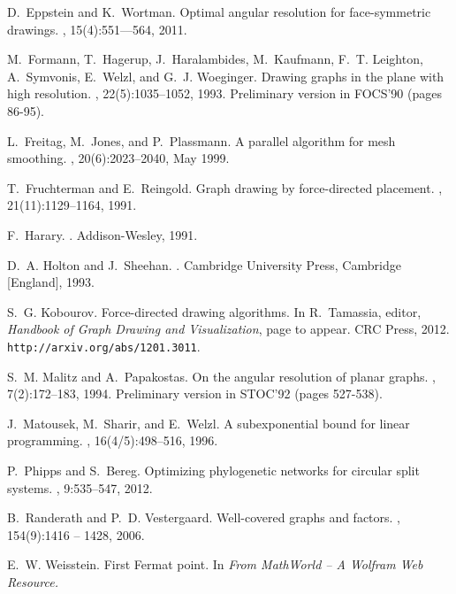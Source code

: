 \documentclass[10pt]{article}
\begin{document}
\begin{thebibliography}{99}
D.~Eppstein and K.~Wortman.
\newblock Optimal angular resolution for face-symmetric drawings.
,
  15(4):551--–564, 2011.

M.~Formann, T.~Hagerup, J.~Haralambides, M.~Kaufmann, F.~T. Leighton,
  A.~Symvonis, E.~Welzl, and G.~J. Woeginger.
\newblock Drawing graphs in the plane with high resolution.
, 22(5):1035--1052, 1993. {Preliminary version
  in FOCS'90 (pages 86-95)}.

L.~Freitag, M.~Jones, and P.~Plassmann.
\newblock A parallel algorithm for mesh smoothing.
, 20(6):2023--2040, May 1999.

T.~Fruchterman and E.~Reingold.
\newblock Graph drawing by force-directed placement.
, 21(11):1129--1164, 1991.

F.~Harary.
.
\newblock Addison-Wesley, 1991.

D.~A. Holton and J.~Sheehan.
.
\newblock Cambridge University Press, Cambridge [England], 1993.

S.~G. Kobourov.
\newblock Force-directed drawing algorithms.
\newblock In R.~Tamassia, editor, {\em Handbook of Graph Drawing and
  Visualization}, page to appear. CRC Press, 2012. {\tt
  http://arxiv.org/abs/1201.3011}.

S.~M. Malitz and A.~Papakostas.
\newblock On the angular resolution of planar graphs.
, 7(2):172--183, 1994. {Preliminary
  version in STOC'92 (pages 527-538)}.

J.~Matousek, M.~Sharir, and E.~Welzl.
\newblock A subexponential bound for linear programming.
, 16(4/5):498--516, 1996.

P.~Phipps and S.~Bereg.
\newblock Optimizing phylogenetic networks for circular split systems.
, 9:535--547, 2012.

B.~Randerath and P.~D. Vestergaard.
\newblock Well-covered graphs and factors.
, 154(9):1416 -- 1428, 2006.

E.~W. Weisstein.
\newblock First {F}ermat point.
\newblock In {\em From MathWorld -- A Wolfram Web Resource.}

\end{thebibliography}
\end{document}

